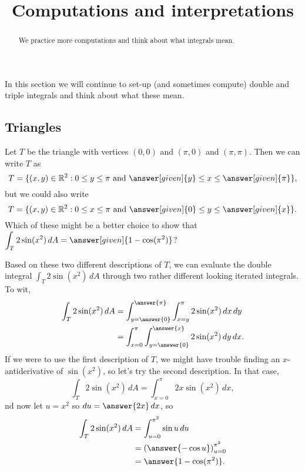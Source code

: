 \documentclass{ximera}
\title[Dig-In:]{Computations and interpretations}
\begin{document}
\begin{abstract}
  We practice more computations and think about what integrals mean.
\end{abstract}
\maketitle

In this section we will continue to set-up (and sometimes compute)
double and triple integrals and think about what these mean.

\subsection{Triangles}

\begin{example}
  Let $T$ be the triangle with vertices $(0,0)$ and $(\pi,0)$ and $(\pi,\pi)$.  Then we can write $T$ as
  \[
    T = \{ (x,y) \in \mathbb{R}^2 : 0 \leq y \leq \pi \mbox{ and } \answer[given]{y} \leq x \leq \answer[given]{\pi} \},
  \]
  but we could also write
  \[
    T = \{ (x,y) \in \mathbb{R}^2 : 0 \leq x \leq \pi \mbox{ and } \answer[given]{0} \leq y \leq \answer[given]{x} \}.
  \]
  Which of these might be a better choice to show that $\displaystyle\int_T 2 \sin (x^2) \, dA = \answer[given]{1 - \cos(\pi^2)}$?
  
  \begin{explanation}
    Based on these two different descriptions of $T$, we can evaluate
    the double integral $\int_T 2 \sin (x^2) \, dA$ through two rather
    different looking iterated integrals.  To wit,
    \begin{align*}
      \int_T 2 \sin (x^2) \, dA 
      &= \int_{y = \answer{0}}^{\answer{\pi}} \int_{x = y}^\pi 2 \sin (x^2) \, dx \, dy \\
      &= \int_{x = 0}^\pi \int_{y = \answer{0}}^{\answer{x}} 2 \sin (x^2) \, dy \, dx.
    \end{align*}
    If we were to use the first description of $T$, we might have
    trouble finding an $x$-antiderivative of $\sin (x^2)$, so let's
    try the second description.  In that case,
    \[
      \int_T 2 \sin (x^2) \, dA = \int_{x = 0}^\pi 2 x \sin (x^2) \, dx,
    \]
    nd now let $u = x^2$ so $du = \answer{2x} \, dx$, so 
    \begin{align*}
      \int_T 2 \sin (x^2) \, dA 
      &= \int_{u = 0}^{\pi^2} \sin u \, du \\
      &= \left( \answer{- \cos u} \right)_{u=0}^{\pi^2} \\
      &= \answer{1 - \cos (\pi^2)}.
    \end{align*}
  \end{explanation}
\end{example}
\end{document}
